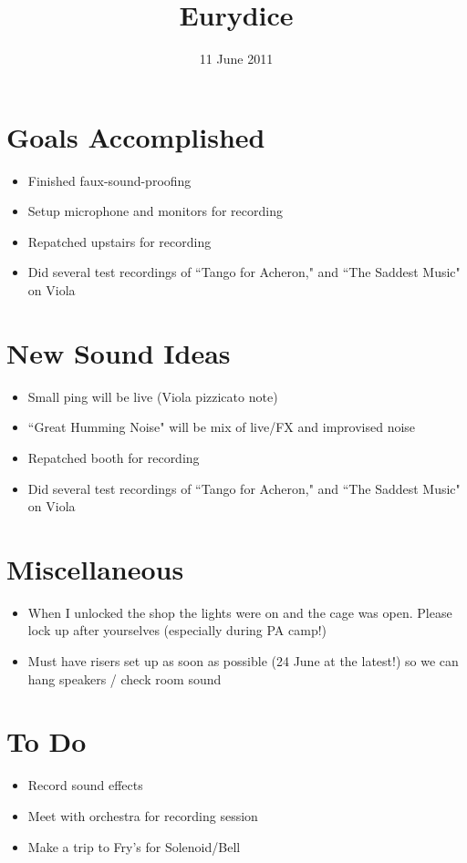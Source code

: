 \documentclass[11pt]{article}
\title{Eurydice}
\date{11 June 2011}
\begin{document}
\maketitle

\section*{Goals Accomplished}

\begin{itemize}
	\item Finished faux-sound-proofing
	\item Setup microphone and monitors for recording
	\item Repatched upstairs for recording
	\item Did several test recordings of ``Tango for Acheron," and ``The Saddest Music" on Viola
\end{itemize}

\section*{New Sound Ideas}

\begin{itemize}
	\item Small ping will be live (Viola pizzicato note)
	\item ``Great Humming Noise" will be mix of live/FX and improvised noise
	\item Repatched booth for recording
	\item Did several test recordings of ``Tango for Acheron," and ``The Saddest Music" on Viola
\end{itemize}

\section*{Miscellaneous}

\begin{itemize}
	\item When I unlocked the shop the lights were on and the cage was open. Please lock up after yourselves (especially during PA camp!)
	\item Must have risers set up as soon as possible (24 June at the latest!) so we can hang speakers / check room sound
\end{itemize}

\section*{To Do}

\begin{itemize}
	\item Record sound effects
	\item Meet with orchestra for recording session
	\item Make a trip to Fry's for Solenoid/Bell
\end{itemize}

\attendance
\end{document}
